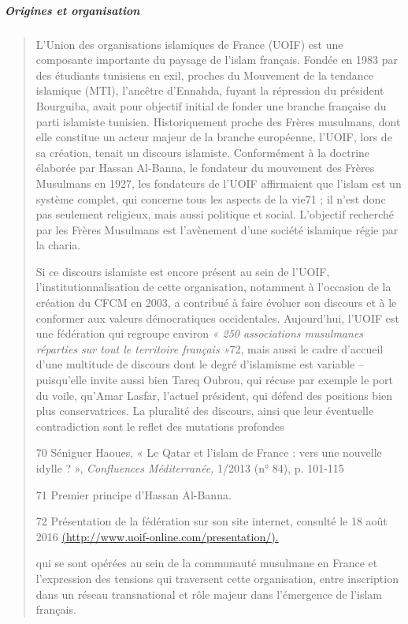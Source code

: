 \hypertarget{origines-et-organisation}{%
\subparagraph{Origines et organisation}\label{origines-et-organisation}}

\begin{quote}
L'Union des organisations islamiques de France (UOIF) est une composante
importante du paysage de l'islam français. Fondée en 1983 par des
étudiants tunisiens en exil, proches du Mouvement de la tendance
islamique (MTI), l'ancêtre d'Ennahda, fuyant la répression du président
Bourguiba, avait pour objectif initial de fonder une branche française
du parti islamiste tunisien. Historiquement proche des Frères musulmans,
dont elle constitue un acteur majeur de la branche européenne, l'UOIF,
lors de sa création, tenait un discours islamiste. Conformément à la
doctrine élaborée par Hassan Al-Banna, le fondateur du mouvement des
Frères Musulmans en 1927, les fondateurs de l'UOIF affirmaient que
l'islam est un système complet, qui concerne tous les aspects de la
vie71 ; il n'est donc pas seulement religieux, mais aussi politique et
social. L'objectif recherché par les Frères Musulmans est l'avènement
d'une société islamique régie par la charia.

Si ce discours islamiste est encore présent au sein de l'UOIF,
l'institutionnalisation de cette organisation, notamment à l'occasion de
la création du CFCM en 2003, a contribué à faire évoluer son discours et
à le conformer aux valeurs démocratiques occidentales. Aujourd'hui,
l'UOIF est une fédération qui regroupe environ \emph{« 250 associations
musulmanes réparties sur tout le territoire français »}72, mais aussi le
cadre d'accueil d'une multitude de discours dont le degré d'islamisme
est variable -- puisqu'elle invite aussi bien Tareq Oubrou, qui récuse
par exemple le port du voile, qu'Amar Lasfar, l'actuel président, qui
défend des positions bien plus conservatrices. La pluralité des
discours, ainsi que leur éventuelle contradiction sont le reflet des
mutations profondes

70 Séniguer Haoues, « Le Qatar et l'islam de France : vers une nouvelle
idylle ? », \emph{Confluences Méditerranée,} 1/2013 (n° 84), p. 101-115

71 Premier principe d'Hassan Al-Banna.

72 Présentation de la fédération sur son site internet, consulté le 18
août 2016
\href{http://www.uoif-online.com/presentation/)}{(http://www.uoif-online.com/presentation/).}



qui se sont opérées au sein de la communauté musulmane en France et
l'expression des tensions qui traversent cette organisation, entre
inscription dans un réseau transnational et rôle majeur dans l'émergence
de l'islam français.


\end{quote}
